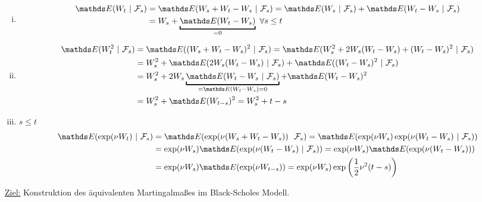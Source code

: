 \\
\begin{enumerate}[(i)]
	\item 
	\begin{equation*}
	\begin{aligned}
		\E(W_t~|~\F_s)&= \E(W_s+W_t-W_s~|~\F_s)=\E(W_s~|~\F_s)+\E(W_t-W_s~|~\F_s)\\
		&= W_s+\underbracket{\E(W_t-W_s)}_{=0}~\forall s\le t
	\end{aligned}
	\end{equation*}
	\item\begin{equation*}
	\begin{aligned}
		\E(W_t^2~|~\F_s)&= \E((W_s+W_t-W_s)^2~|~\F_s)=\E(W_s^2+2W_s(W_t-W_s)+(W_t-W_s)^2~|~\F_s)\\
		&= W_s^2+ \E(2W_s(W_t-W_s)~|~\F_s)+ \E((W_t-W_s)^2~|~\F_s)\\
		&= W_s^2+2W_s\underbracket{\E(W_t-W_s~|~\F_s)}_{=\E(W_t-W_s)=0}+ \E(W_t-W_s)^2\\
		&= W_s^2+ \E(W_{t-s})^2 = W_s^2+t-s
	\end{aligned}
	\end{equation*}
	\item $s\le t$
	\begin{equation*}
	\begin{aligned}
		\E(\exp(\nu W_t)~|~\F_s) &= \E(\exp(\nu(W_s+W_t-W_s))~~\F_s)= \E(\exp(\nu W_s)\exp(\nu(W_t-W_s)~|~\F_s))\\
		&= \exp(\nu W_s)\E(\exp(\nu(W_t-W_s)~|~\F_s)) = \exp(\nu W_s)\E(\exp(\nu(W_t-W_s)))\\
		&= \exp(\nu W_s)\E(\exp(\nu W_{t-s})) = \exp(\nu W_s)\exp\enbrace{\frac{1}{2}\nu^2(t-s)}
	\end{aligned}
	\end{equation*}
\end{enumerate}

\uline{Ziel:} 
Konstruktion des äquivalenten Martingalmaßes im Black-Scholes Modell.

